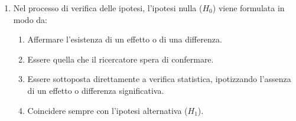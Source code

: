 \documentclass[12pt, a4paper]{article}
\begin{document}
\begin{enumerate}[resume]
    \item Nel processo di verifica delle ipotesi, l'ipotesi nulla ($H_0$) viene formulata in modo da:
    \begin{enumerate}
        \item Affermare l'esistenza di un effetto o di una differenza.
        \item Essere quella che il ricercatore spera di confermare.
        \item Essere sottoposta direttamente a verifica statistica, ipotizzando l'assenza di un effetto o differenza significativa.
        \item Coincidere sempre con l'ipotesi alternativa ($H_1$).
    \end{enumerate}
    \vspace{0.3cm}
\end{enumerate}

\end{document}

